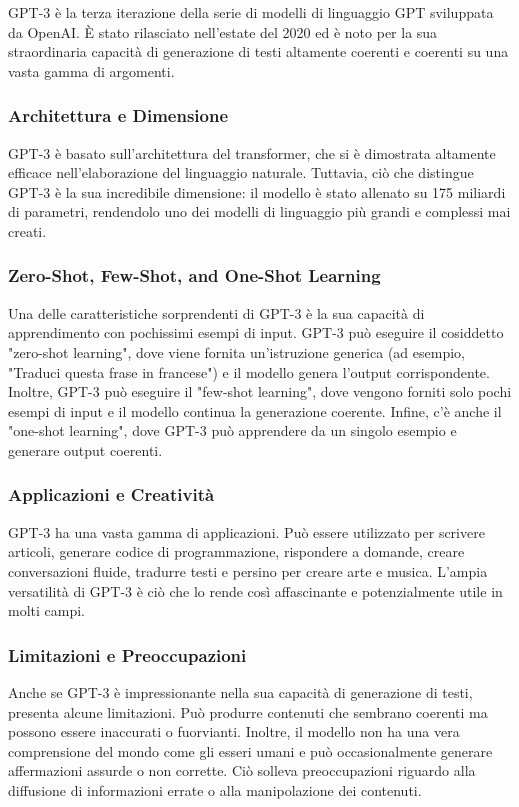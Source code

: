GPT-3 è la terza iterazione della serie di modelli di linguaggio GPT sviluppata da OpenAI. È stato rilasciato nell'estate del 2020 ed è noto per la sua straordinaria capacità di generazione di testi altamente coerenti e coerenti su una vasta gamma di argomenti.

\subsubsection{Architettura e Dimensione}
GPT-3 è basato sull'architettura del transformer, che si è dimostrata altamente efficace nell'elaborazione del linguaggio naturale. Tuttavia, ciò che distingue GPT-3 è la sua incredibile dimensione: il modello è stato allenato su 175 miliardi di parametri, rendendolo uno dei modelli di linguaggio più grandi e complessi mai creati.

\subsubsection{Zero-Shot, Few-Shot, and One-Shot Learning}
Una delle caratteristiche sorprendenti di GPT-3 è la sua capacità di apprendimento con pochissimi esempi di input. GPT-3 può eseguire il cosiddetto "zero-shot learning", dove viene fornita un'istruzione generica (ad esempio, "Traduci questa frase in francese") e il modello genera l'output corrispondente. Inoltre, GPT-3 può eseguire il "few-shot learning", dove vengono forniti solo pochi esempi di input e il modello continua la generazione coerente. Infine, c'è anche il "one-shot learning", dove GPT-3 può apprendere da un singolo esempio e generare output coerenti.

\subsubsection{Applicazioni e Creatività}
GPT-3 ha una vasta gamma di applicazioni. Può essere utilizzato per scrivere articoli, generare codice di programmazione, rispondere a domande, creare conversazioni fluide, tradurre testi e persino per creare arte e musica. L'ampia versatilità di GPT-3 è ciò che lo rende così affascinante e potenzialmente utile in molti campi.

\subsubsection{Limitazioni e Preoccupazioni}
Anche se GPT-3 è impressionante nella sua capacità di generazione di testi, presenta alcune limitazioni. Può produrre contenuti che sembrano coerenti ma possono essere inaccurati o fuorvianti. Inoltre, il modello non ha una vera comprensione del mondo come gli esseri umani e può occasionalmente generare affermazioni assurde o non corrette. Ciò solleva preoccupazioni riguardo alla diffusione di informazioni errate o alla manipolazione dei contenuti.

